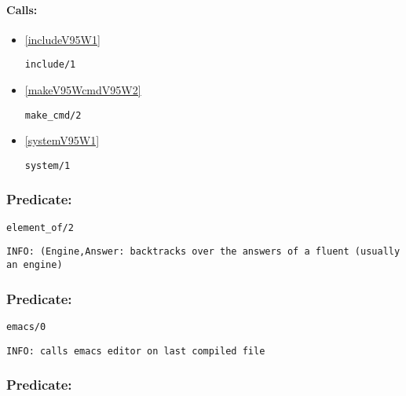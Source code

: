\paragraph{Calls:} 
\begin{itemize}
\item \ref{includeV95W1} 
\begin{verbatim}
include/1
\end{verbatim}

\item \ref{makeV95WcmdV95W2} 
\begin{verbatim}
make_cmd/2
\end{verbatim}

\item \ref{systemV95W1} 
\begin{verbatim}
system/1
\end{verbatim}

\end{itemize}

\subsubsection{Predicate:} \label{elementV95WofV95W2}

\begin{verbatim}
element_of/2
\end{verbatim}

{\small \begin{verbatim}
INFO: (Engine,Answer: backtracks over the answers of a fluent (usually an engine)

\end{verbatim}}

\subsubsection{Predicate:} \label{emacsV95W0}

\begin{verbatim}
emacs/0
\end{verbatim}

{\small \begin{verbatim}
INFO: calls emacs editor on last compiled file

\end{verbatim}}

\subsubsection{Predicate:} \label{endV95WcriticalV95W0}

